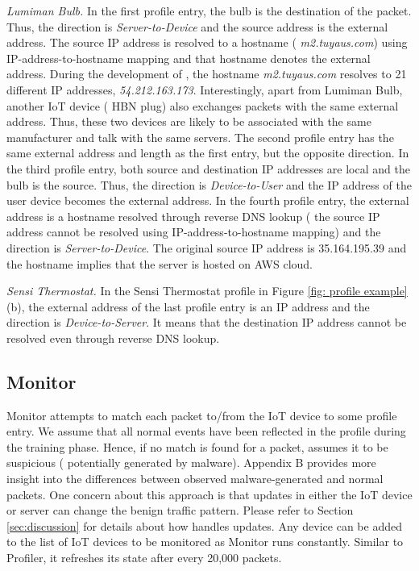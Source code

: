 \noindent \textit{Lumiman Bulb.}
In the first profile entry, the bulb is the destination of the packet. Thus, the direction is \textit{Server-to-Device} and the source address is the external address. The source IP address is resolved to a hostname (\ie{} \textit{m2.tuyaus.com}) using IP-address-to-hostname mapping and that hostname denotes the external address. 
During the development of \system{}, the hostname \textit{m2.tuyaus.com} resolves to 21 different IP addresses, \eg{} \textit{54.212.163.173}. Interestingly, apart from Lumiman Bulb, another IoT device (\ie{} HBN plug) also exchanges packets with the same external address. Thus, these two devices are likely to be associated with the same manufacturer and talk with the same servers. The second profile entry has the same external address and length as the first entry, but the opposite direction. 
In the third profile entry, both source and destination IP addresses are local and the bulb is the source. Thus, the direction is \textit{Device-to-User} and the IP address of the user device becomes the external address. In the fourth profile entry, the external address is a hostname resolved through reverse DNS lookup (\ie{} the source IP address cannot be resolved using IP-address-to-hostname mapping) and the direction is \textit{Server-to-Device}. The original source IP address is 35.164.195.39 and the hostname implies that the server is hosted on AWS cloud. 

\noindent\textit{Sensi Thermostat.}
In the Sensi Thermostat profile in Figure \ref{fig: profile example}(b), the external address of the last profile entry is an IP address and the direction is \textit{Device-to-Server}. It means that the destination IP address cannot be resolved even through reverse DNS lookup.

\subsection{Monitor}
Monitor attempts to match each packet to/from the IoT device to some profile entry. We assume that all normal events have been reflected in the profile during the training phase. Hence, if no match is found for a packet, \system{} assumes it to be suspicious (\ie{} potentially generated by malware). Appendix B provides more insight into the differences between observed malware-generated and normal packets. One concern about this approach is that updates in either the IoT device or server can change the benign traffic pattern. Please refer to Section \ref{sec:discussion} for details about how \system{} handles updates. Any device can be added to the list of IoT devices to be monitored as Monitor runs constantly. Similar to Profiler, it refreshes its state after every 20,000 packets. 

